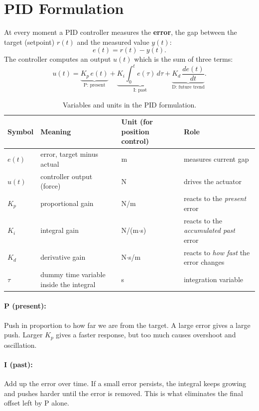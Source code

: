 \documentclass[10pt]{article}
\begin{document}
	\section{PID Formulation}
	At every moment a PID controller measures the \textbf{error}, the gap between the target (setpoint) $r(t)$ and the measured value $y(t)$:
	\begin{equation}
		e(t) = r(t) - y(t).
	\end{equation}
	The controller computes an output $u(t)$ which is the sum of three terms:
	\begin{equation} 
		u(t) = \underbrace{K_p\,e(t)}_{\text{P: present}} + \underbrace{K_i \int_{0}^{t} e(\tau)\,d\tau}_{\text{I: past}} + \underbrace{K_d\, \frac{de(t)}{dt}}_{\text{D: future trend}} .
		\label{eq:pid} 
	\end{equation}
	
	\begin{table}[h]
		\centering
		\small
		\begin{tabular}{llll}
			\toprule
			Symbol & Meaning & Unit (for position control) & Role \\
			\midrule
			$e(t)$ & error, target minus actual & m & measures current gap \\
			$u(t)$ & controller output (force) & N & drives the actuator \\
			$K_p$ & proportional gain & N/m & reacts to the \emph{present} error \\
			$K_i$ & integral gain & N/(m$\cdot$s) & reacts to the \emph{accumulated past} error \\
			$K_d$ & derivative gain & N$\cdot$s/m & reacts to \emph{how fast} the error changes \\
			$\tau$ & dummy time variable inside the integral & s & integration variable \\
			\bottomrule
		\end{tabular}
		\caption{Variables and units in the PID formulation.}
	\end{table}
	
	\paragraph{P (present):} Push in proportion to how far we are from the target. A large error gives a large push. Larger $K_p$ gives a faster response, but too much causes overshoot and oscillation.
	\paragraph{I (past):} Add up the error over time. If a small error persists, the integral keeps growing and pushes harder until the error is removed. This is what eliminates the final offset left by P alone.
\end{document}
